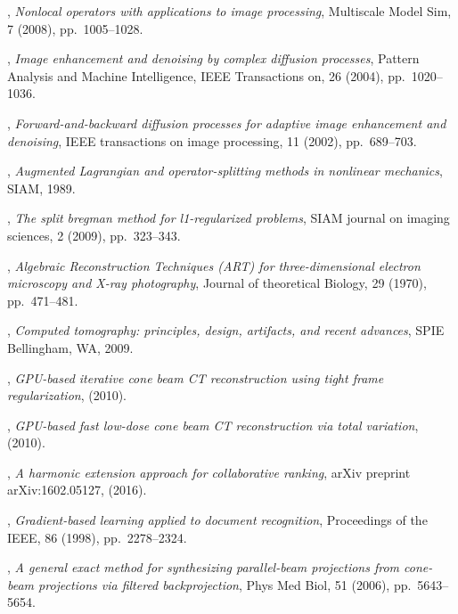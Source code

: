 \documentclass[letterpaper,10pt]{article}
\begin{document}
\begin{thebibliography}{10}
, {\em Nonlocal operators with applications to
  image processing}, Multiscale Model Sim, 7 (2008), pp.~1005--1028.

, {\em Image enhancement and
  denoising by complex diffusion processes}, Pattern Analysis and Machine
  Intelligence, IEEE Transactions on, 26 (2004), pp.~1020--1036.

, {\em Forward-and-backward
  diffusion processes for adaptive image enhancement and denoising}, IEEE
  transactions on image processing, 11 (2002), pp.~689--703.

, {\em Augmented Lagrangian and
  operator-splitting methods in nonlinear mechanics}, SIAM, 1989.

, {\em The split bregman method for
  l1-regularized problems}, SIAM journal on imaging sciences, 2 (2009),
  pp.~323--343.

, {\em {Algebraic Reconstruction
  Techniques (ART) for three-dimensional electron microscopy and X-ray
  photography}}, Journal of theoretical Biology, 29 (1970), pp.~471--481.

, {\em Computed tomography: principles, design, artifacts, and
  recent advances}, SPIE Bellingham, WA, 2009.

, {\em {GPU}-based iterative cone
  beam {CT} reconstruction using tight frame regularization},  (2010).

, {\em
  {GPU}-based fast low-dose cone beam {CT} reconstruction via total variation},
   (2010).

, {\em A harmonic extension
  approach for collaborative ranking}, arXiv preprint arXiv:1602.05127,
  (2016).

, {\em Gradient-based
  learning applied to document recognition}, Proceedings of the IEEE, 86
  (1998), pp.~2278--2324.

, {\em A general
  exact method for synthesizing parallel-beam projections from cone-beam
  projections via filtered backprojection}, Phys Med Biol, 51 (2006),
  pp.~5643--5654.


\end{thebibliography}
\end{document}
